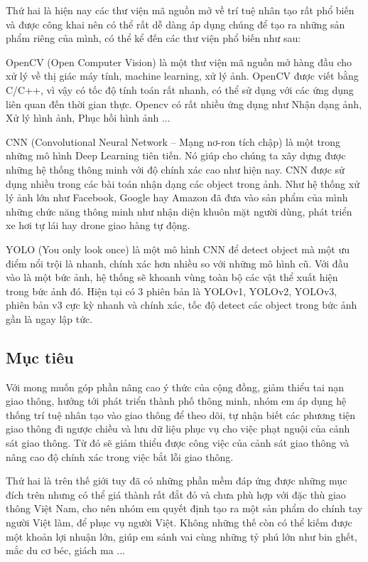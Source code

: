 \documentclass[12pt,twoside,a4paper]{article}
\begin{document}
Thứ hai là hiện nay các thư viện mã nguồn mở về trí tuệ nhân tạo rất phổ biến và được công khai nên có thể rất dễ dàng áp dụng chúng để tạo ra những sản phẩm riêng của mình, có thể kể đến các thư viện phổ biến như sau:

OpenCV (Open Computer Vision) là một thư viện mã nguồn mở hàng đầu cho xử lý về thị giác máy tính, machine learning, xử lý ảnh. OpenCV được viết bằng C/C++, vì vậy có tốc độ tính toán rất nhanh, có thể sử dụng với các ứng dụng liên quan đến thời gian thực. Opencv có rất nhiều ứng dụng như Nhận dạng ảnh, Xử lý hình ảnh, Phục hồi hình ảnh ...

CNN (Convolutional Neural Network – Mạng nơ-ron tích chập) là một trong những mô hình Deep Learning tiên tiến. Nó giúp cho chúng ta xây dựng được những hệ thống thông minh với độ chính xác cao như hiện nay. CNN được sử dụng nhiều trong các bài toán nhận dạng các object trong ảnh. Như hệ thống xử lý ảnh lớn như Facebook, Google hay Amazon đã đưa vào sản phẩm của mình những chức năng thông minh như nhận diện khuôn mặt người dùng, phát triển xe hơi tự lái hay drone giao hàng tự động.

YOLO (You only look once) là một mô hình CNN để detect object mà một ưu điểm nổi trội là nhanh, chính xác hơn nhiều so với những mô hình cũ. Với đầu vào là một bức ảnh, hệ thống sẽ khoanh vùng toàn bộ các vật thể xuất hiện trong bức ảnh đó. Hiện tại có 3 phiên bản là YOLOv1, YOLOv2, YOLOv3, phiên bản v3 cực kỳ nhanh và chính xác, tốc độ detect các object trong bức ảnh gần là ngay lập tức.

\subsection{Mục tiêu}
Với mong muốn góp phần nâng cao ý thức của cộng đồng, giảm thiểu tai nạn giao thông, hướng tới phát triển thành phố thông minh, nhóm em áp dụng hệ thống trí tuệ nhân tạo vào giao thông để theo dõi, tự nhận biết các phương tiện giao thông đi ngược chiều và lưu dữ liệu phục vụ cho việc phạt nguội của cảnh sát giao thông. Từ đó sẽ giảm thiểu được công việc của cảnh sát giao thông và nâng cao độ chính xác trong việc bắt lỗi giao thông.

Thứ hai là trên thế giới tuy đã có những phần mềm đáp ứng được những mục đích trên nhưng có thể giá thành rất đắt đỏ và chưa phù hợp với đặc thù giao thông Việt Nam, cho nên nhóm em quyết định tạo ra một sản phẩm do chính tay người Việt làm, để phục vụ người Việt. Không những thế còn có thể kiếm được một khoản lợi nhuận lớn, giúp em sánh vai cùng những tỷ phú lớn như bin ghết, mắc du cơ béc, giách ma ...
\end{document}
